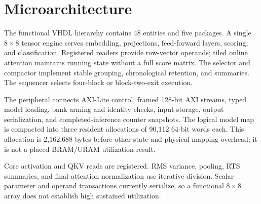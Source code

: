 \section{Microarchitecture}
\label{sec:microarchitecture}
The functional VHDL hierarchy contains 48 entities and five packages. A single
$8\times8$ tensor engine serves embedding, projections, feed-forward layers,
scoring, and classification. Registered readers provide row-vector operands;
tiled online attention maintains running state without a full score matrix.
The selector and compactor implement stable grouping, chronological retention,
and summaries. The sequencer selects four-block or block-two-exit execution.

The peripheral connects AXI-Lite control, framed 128-bit AXI streams, typed model
loading, bank arming and identity checks, input storage, output serialization,
and completed-inference counter snapshots. The logical model map is compacted
into three resident allocations of 90,112 64-bit words each. This allocation
is 2,162,688 bytes before other state and physical mapping overhead; it is not
a placed BRAM/URAM utilization result.

Core activation and QKV reads are registered. RMS variance, pooling, RTS
summaries, and final attention normalization use iterative division. Scalar
parameter and operand transactions currently serialize, so a functional
$8\times8$ array does not establish high sustained utilization.
